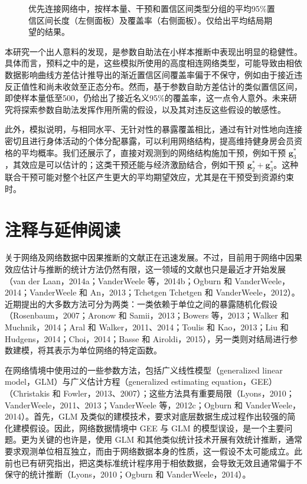 \begin{landscape}
\begin{figure}[p]
 \centering
 
 \caption{优先连接网络中，按样本量、干预和置信区间类型分组的平均95\%置信区间长度（左侧面板）及覆盖率（右侧面板）。仅给出平均结局期望的结果。}
 \label{fig:ch21:simulation}
\end{figure}
\end{landscape}

本研究一个出人意料的发现，是参数自助法在小样本推断中表现出明显的稳健性。具体而言，预料之中的是，这些模拟所使用的高度相连网络类型，可能导致由相依数据影响曲线方差估计推导出的渐近置信区间覆盖率偏于不保守，例如由于接近违反正值性和尚未收敛至正态分布。然而，基于参数自助方差估计的类似置信区间，即使样本量低至500，仍给出了接近名义95\%的覆盖率，这一点令人意外。未来研究将探索参数自助法发挥作用所需的假设，以及其对违反这些假设的敏感性。

此外，模拟说明，与相同水平、无针对性的暴露覆盖相比，通过有针对性地向连接密切且进行身体活动的个体分配暴露，可以利用网络结构，提高维持健身房会员资格的平均概率。我们还展示了，直接对观测到的网络结构施加干预，例如干预 $\bm g_3^*$，其效应是可以估计的；这类干预还能与经济激励结合，例如干预 $\bm g_2^*+\bm g_3^*$。这种联合干预可能对整个社区产生更大的平均期望效应，尤其是在干预受到资源约束时。

\section{注释与延伸阅读}

关于网络及网络数据中因果推断的文献正在迅速发展。不过，目前用于网络中因果效应估计与推断的统计方法仍然有限，这一领域的文献也只是最近才开始发展（van der Laan，2014a；VanderWeele 等，2014b；Ogburn 和 VanderWeele，2014；VanderWeele 和 An，2013；Tchetgen Tchetgen 和 VanderWeele，2012）。近期提出的大多数方法可分为两类：一类依赖于单位之间的暴露随机化假设（Rosenbaum，2007；Aronow 和 Samii，2013；Bowers 等，2013；Walker 和 Muchnik，2014；Aral 和 Walker，2011、2014；Toulis 和 Kao，2013；Liu 和 Hudgens，2014；Choi，2014；Basse 和 Airoldi，2015），另一类则对结局进行参数建模，将其表示为单位网络的特定函数。

在网络情境中使用过的一些参数方法，包括广义线性模型（generalized linear model，GLM）与广义估计方程（generalized estimating equation，GEE）（Christakis 和 Fowler，2013、2007）；这些方法具有重要局限（Lyons，2010；VanderWeele，2011、2013；VanderWeele 等，2012c；Ogburn 和 VanderWeele，2014）。首先，GLM 及类似的建模技术，要求对底层数据生成过程作出较强的简化建模假设。因此，网络数据情境中 GEE 与 GLM 的模型误设，是一个主要问题。更为关键的也许是，使用 GLM 和其他类似统计技术开展有效统计推断，通常要求观测单位相互独立，而由于网络数据本身的性质，这一假设不太可能成立。此前也已有研究指出，把这类标准统计程序用于相依数据，会导致无效且通常偏于不保守的统计推断（Lyons，2010；Ogburn 和 VanderWeele，2014）。

